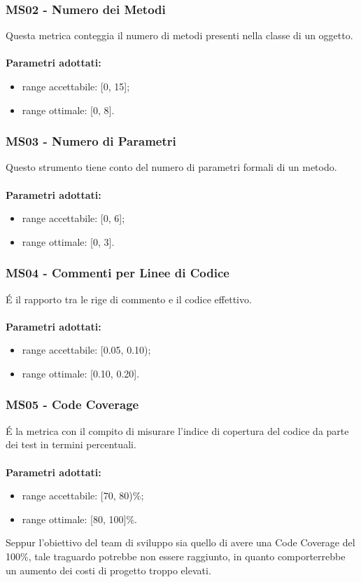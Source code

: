 \subsubsection{MS02 - Numero dei Metodi}
Questa metrica conteggia il numero di metodi presenti nella classe di un oggetto.\\ \\ 
\textbf{Parametri adottati:} 
\begin{itemize}
\item range accettabile: [0, 15];
\item range ottimale: [0, 8].
\end{itemize}
\subsubsection{MS03 - Numero di Parametri}
Questo strumento tiene conto del numero di parametri formali di un metodo.\\ \\ 
\textbf{Parametri adottati:} 
\begin{itemize}
\item range accettabile: [0, 6];
\item range ottimale: [0, 3].
\end{itemize}
\subsubsection{MS04 - Commenti per Linee di Codice}
\'E il rapporto tra le rige di commento e il codice effettivo.\\ \\ 
\textbf{Parametri adottati:} 
\begin{itemize}
\item range accettabile: [0.05, 0.10);
\item range ottimale: [0.10, 0.20].
\end{itemize}
\subsubsection{MS05 - Code Coverage}
\'E la metrica con il compito di misurare l'indice di copertura del codice da parte dei test in termini percentuali.\\ \\ 
\textbf{Parametri adottati:} 
\begin{itemize}
\item range accettabile: [70, 80)\%;
\item range ottimale: [80, 100]\%.
\end{itemize}
Seppur l'obiettivo del team di sviluppo sia quello di avere una Code Coverage del 100\%, tale traguardo potrebbe non essere raggiunto, in quanto comporterrebbe un aumento dei costi di progetto troppo elevati.